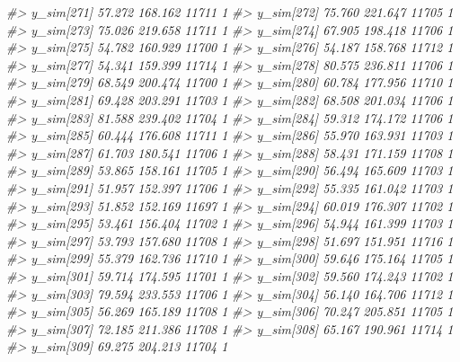 \documentclass[
  10pt,
  italian,
  a4paper,
  extrafontsizes,onecolumn,openright
  ]{memoir}
\newenvironment{Shaded}{\begin{snugshade}}{\end{snugshade}}
\newcommand{\CommentTok}[1]{\textcolor[rgb]{0.56,0.35,0.01}{\textit{#1}}}
\begin{document}
\begin{Shaded}
\begin{Highlighting}[]
\CommentTok{\#\textgreater{} y\_sim[271] 57.272 168.162 11711    1}
\CommentTok{\#\textgreater{} y\_sim[272] 75.760 221.647 11705    1}
\CommentTok{\#\textgreater{} y\_sim[273] 75.026 219.658 11711    1}
\CommentTok{\#\textgreater{} y\_sim[274] 67.905 198.418 11706    1}
\CommentTok{\#\textgreater{} y\_sim[275] 54.782 160.929 11700    1}
\CommentTok{\#\textgreater{} y\_sim[276] 54.187 158.768 11712    1}
\CommentTok{\#\textgreater{} y\_sim[277] 54.341 159.399 11714    1}
\CommentTok{\#\textgreater{} y\_sim[278] 80.575 236.811 11706    1}
\CommentTok{\#\textgreater{} y\_sim[279] 68.549 200.474 11700    1}
\CommentTok{\#\textgreater{} y\_sim[280] 60.784 177.956 11710    1}
\CommentTok{\#\textgreater{} y\_sim[281] 69.428 203.291 11703    1}
\CommentTok{\#\textgreater{} y\_sim[282] 68.508 201.034 11706    1}
\CommentTok{\#\textgreater{} y\_sim[283] 81.588 239.402 11704    1}
\CommentTok{\#\textgreater{} y\_sim[284] 59.312 174.172 11706    1}
\CommentTok{\#\textgreater{} y\_sim[285] 60.444 176.608 11711    1}
\CommentTok{\#\textgreater{} y\_sim[286] 55.970 163.931 11703    1}
\CommentTok{\#\textgreater{} y\_sim[287] 61.703 180.541 11706    1}
\CommentTok{\#\textgreater{} y\_sim[288] 58.431 171.159 11708    1}
\CommentTok{\#\textgreater{} y\_sim[289] 53.865 158.161 11705    1}
\CommentTok{\#\textgreater{} y\_sim[290] 56.494 165.609 11703    1}
\CommentTok{\#\textgreater{} y\_sim[291] 51.957 152.397 11706    1}
\CommentTok{\#\textgreater{} y\_sim[292] 55.335 161.042 11703    1}
\CommentTok{\#\textgreater{} y\_sim[293] 51.852 152.169 11697    1}
\CommentTok{\#\textgreater{} y\_sim[294] 60.019 176.307 11702    1}
\CommentTok{\#\textgreater{} y\_sim[295] 53.461 156.404 11702    1}
\CommentTok{\#\textgreater{} y\_sim[296] 54.944 161.399 11703    1}
\CommentTok{\#\textgreater{} y\_sim[297] 53.793 157.680 11708    1}
\CommentTok{\#\textgreater{} y\_sim[298] 51.697 151.951 11716    1}
\CommentTok{\#\textgreater{} y\_sim[299] 55.379 162.736 11710    1}
\CommentTok{\#\textgreater{} y\_sim[300] 59.646 175.164 11705    1}
\CommentTok{\#\textgreater{} y\_sim[301] 59.714 174.595 11701    1}
\CommentTok{\#\textgreater{} y\_sim[302] 59.560 174.243 11702    1}
\CommentTok{\#\textgreater{} y\_sim[303] 79.594 233.553 11706    1}
\CommentTok{\#\textgreater{} y\_sim[304] 56.140 164.706 11712    1}
\CommentTok{\#\textgreater{} y\_sim[305] 56.269 165.189 11708    1}
\CommentTok{\#\textgreater{} y\_sim[306] 70.247 205.851 11705    1}
\CommentTok{\#\textgreater{} y\_sim[307] 72.185 211.386 11708    1}
\CommentTok{\#\textgreater{} y\_sim[308] 65.167 190.961 11714    1}
\CommentTok{\#\textgreater{} y\_sim[309] 69.275 204.213 11704    1}

\end{Highlighting}
\end{Shaded}
\end{document}
